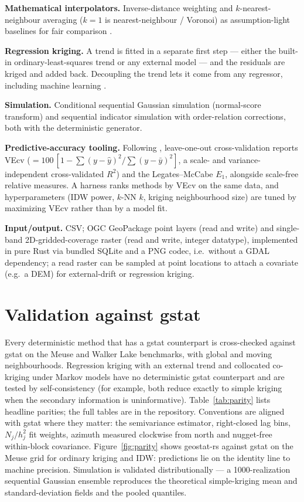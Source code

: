 \documentclass[preprint,12pt,authoryear]{elsarticle}
\begin{document}
\textbf{Mathematical interpolators.} Inverse-distance weighting and
$k$-nearest-neighbour averaging ($k=1$ is nearest-neighbour / Voronoi) as
assumption-light baselines for fair comparison \citep{li2021}.

\textbf{Regression kriging.} A trend is fitted in a separate first step ---
either the built-in ordinary-least-squares trend or any external model --- and
the residuals are kriged and added back. Decoupling the trend lets it come from
any regressor, including machine learning \citep{hengl2018,li2021}.

\textbf{Simulation.} Conditional sequential Gaussian simulation (normal-score
transform) and sequential indicator simulation with order-relation corrections,
both with the deterministic generator.

\textbf{Predictive-accuracy tooling.} Following \citet{li2016}, leave-one-out
cross-validation reports VEcv ($=100\,[1-\sum(y-\hat y)^2/\sum(y-\bar y)^2]$, a
scale- and variance-independent cross-validated $R^2$) and the Legates--McCabe
$E_1$, alongside scale-free relative measures. A harness ranks methods by VEcv
on the same data, and hyperparameters (IDW power, $k$-NN $k$, kriging
neighbourhood size) are tuned by maximizing VEcv rather than by a model fit.

\textbf{Input/output.} CSV; OGC GeoPackage point layers (read and write) and
single-band 2D-gridded-coverage raster (read and write, integer datatype),
implemented in pure Rust via bundled SQLite and a PNG codec, i.e.\ without a
GDAL dependency; a read raster can be sampled at point locations to attach a
covariate (e.g.\ a DEM) for external-drift or regression kriging.

\section{Validation against gstat}
\label{sec:validation}

Every deterministic method that has a gstat counterpart is cross-checked
against gstat on the Meuse and Walker Lake benchmarks, with global and moving
neighbourhoods. Regression kriging with an external trend and collocated
co-kriging under Markov models have no deterministic gstat counterpart and are
tested by self-consistency (for example, both reduce exactly to simple kriging
when the secondary information is uninformative). Table~\ref{tab:parity} lists headline parities; the full
tables are in the repository. Conventions are aligned with gstat where they
matter: the semivariance estimator, right-closed lag bins, $N_j/h_j^2$ fit
weights, azimuth measured clockwise from north and nugget-free within-block
covariance. Figure~\ref{fig:parity} shows geostat-rs against gstat on the Meuse
grid for ordinary kriging and IDW: predictions lie on the identity line to
machine precision. Simulation is validated distributionally --- a
1000-realization sequential Gaussian ensemble reproduces the theoretical
simple-kriging mean and standard-deviation fields and the pooled quantiles.
\end{document}
